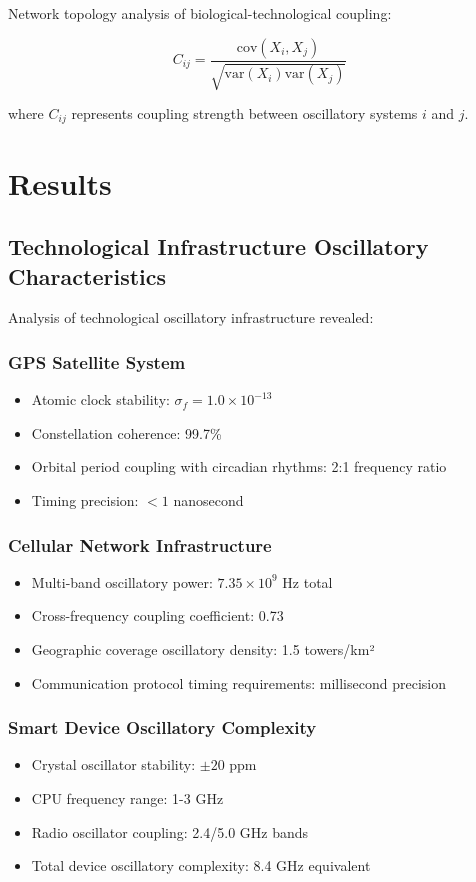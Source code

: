 \documentclass[12pt]{article}
\begin{document}
Network topology analysis of biological-technological coupling:

\begin{equation}
C_{ij} = \frac{\text{cov}(X_i, X_j)}{\sqrt{\text{var}(X_i)\text{var}(X_j)}}
\end{equation}

where $C_{ij}$ represents coupling strength between oscillatory systems $i$ and $j$.

\section{Results}

\subsection{Technological Infrastructure Oscillatory Characteristics}

Analysis of technological oscillatory infrastructure revealed:

\subsubsection{GPS Satellite System}
\begin{itemize}
\item Atomic clock stability: $\sigma_f = 1.0 \times 10^{-13}$
\item Constellation coherence: 99.7\%
\item Orbital period coupling with circadian rhythms: 2:1 frequency ratio
\item Timing precision: $< 1$ nanosecond
\end{itemize}

\subsubsection{Cellular Network Infrastructure}
\begin{itemize}
\item Multi-band oscillatory power: $7.35 \times 10^9$ Hz total
\item Cross-frequency coupling coefficient: 0.73
\item Geographic coverage oscillatory density: 1.5 towers/km²
\item Communication protocol timing requirements: millisecond precision
\end{itemize}

\subsubsection{Smart Device Oscillatory Complexity}
\begin{itemize}
\item Crystal oscillator stability: $\pm 20$ ppm
\item CPU frequency range: 1-3 GHz
\item Radio oscillator coupling: 2.4/5.0 GHz bands
\item Total device oscillatory complexity: 8.4 GHz equivalent
\end{itemize}
\end{document}
